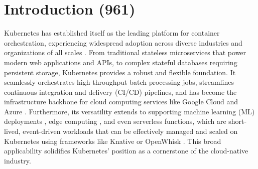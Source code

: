 \chapter{Introduction (961)}
\label{firstcontentpage} %

%
%

%

Kubernetes has established itself as the leading platform for container
orchestration, experiencing widespread adoption across diverse industries and
organizations of all scales \cite{kubernetes-adoption-statistics}. From
traditional stateless microservices that power modern web applications and
APIs, to complex stateful databases requiring persistent storage, Kubernetes
provides a robust and flexible foundation. It seamlessly orchestrates
high-throughput batch processing jobs, streamlines continuous integration and
delivery (CI/CD) pipelines, and has become the infrastructure backbone for
cloud computing services like Google Cloud and Azure \cite{google-gke, azure-aks}. Furthermore, its
versatility extends to supporting machine learning (ML) deployments
\cite{kubernetes-ai}, edge computing \cite{cloudraft}, and even serverless
functions, which are short-lived, event-driven workloads that can be
effectively managed and scaled on Kubernetes using frameworks like Knative or
OpenWhisk \cite{knative, openwhisk}. This broad applicability solidifies
Kubernetes' position as a cornerstone of the cloud-native industry.

